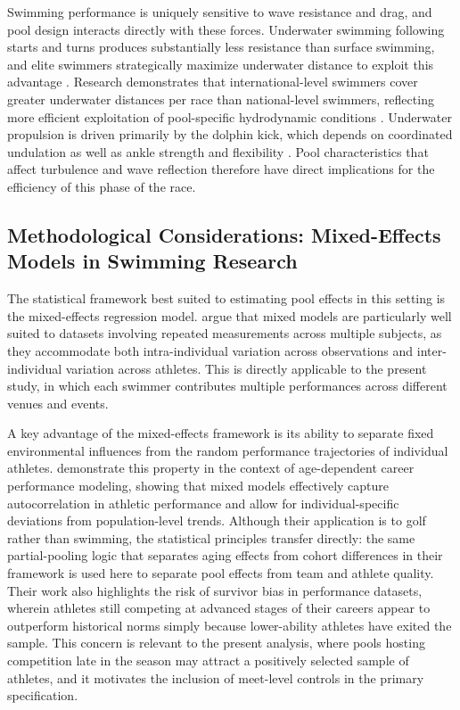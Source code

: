 \documentclass[12pt]{article}
\begin{document}
Swimming performance is uniquely sensitive to wave resistance and drag, and
pool design interacts directly with these forces. Underwater swimming following
starts and turns produces substantially less resistance than surface swimming,
and elite swimmers strategically maximize underwater distance to exploit this
advantage \parencite{vernell2006}. Research demonstrates that international-level
swimmers cover greater underwater distances per race than national-level
swimmers, reflecting more efficient exploitation of pool-specific hydrodynamic
conditions \parencite{pla2021}. Underwater propulsion is driven primarily by the
dolphin kick, which depends on coordinated undulation as well as ankle strength
and flexibility \parencite{shimojo2019, willems2014}. Pool characteristics that
affect turbulence and wave reflection therefore have direct implications for the
efficiency of this phase of the race.

\subsection{Methodological Considerations: Mixed-Effects Models in Swimming
Research}

The statistical framework best suited to estimating pool effects in this setting
is the mixed-effects regression model. \textcite{avalos2003} argue that mixed
models are particularly well suited to datasets involving repeated measurements
across multiple subjects, as they accommodate both intra-individual variation
across observations and inter-individual variation across athletes. This is
directly applicable to the present study, in which each swimmer contributes
multiple performances across different venues and events.

A key advantage of the mixed-effects framework is its ability to separate fixed
environmental influences from the random performance trajectories of individual
athletes. \textcite{baker2023} demonstrate this property in the context of
age-dependent career performance modeling, showing that mixed models effectively
capture autocorrelation in athletic performance and allow for individual-specific
deviations from population-level trends. Although their application is to golf
rather than swimming, the statistical principles transfer directly: the same
partial-pooling logic that separates aging effects from cohort differences in
their framework is used here to separate pool effects from team and athlete
quality. Their work also highlights the risk of survivor bias in performance
datasets, wherein athletes still competing at advanced stages of their careers
appear to outperform historical norms simply because lower-ability athletes have
exited the sample. This concern is relevant to the present analysis, where pools
hosting competition late in the season may attract a positively selected sample
of athletes, and it motivates the inclusion of meet-level controls in the
primary specification.
\end{document}
